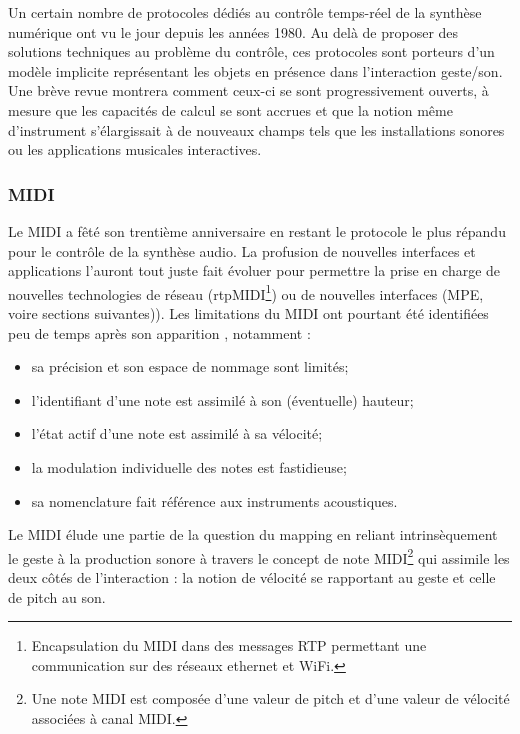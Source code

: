 Un certain nombre de protocoles dédiés au contrôle temps-réel de la synthèse numérique ont vu le jour depuis les années 1980. Au delà de proposer des solutions techniques au problème du contrôle, ces protocoles sont porteurs d’un modèle implicite représentant les objets en présence dans l’interaction geste/son. Une brève revue montrera comment ceux-ci se sont progressivement ouverts, à mesure que les capacités de calcul se sont accrues et que la notion même d’instrument s’élargissait à de nouveaux champs tels que les installations sonores ou les applications musicales interactives.

\subsubsection{MIDI}
Le \gls{MIDI} a fêté son trentième anniversaire en restant le protocole le plus répandu pour le contrôle de la synthèse audio. La profusion de nouvelles interfaces et applications l'auront tout juste fait évoluer pour permettre la prise en charge de nouvelles technologies de réseau (rtpMIDI\footnote{ Encapsulation du MIDI dans des messages RTP permettant une communication sur des réseaux ethernet et WiFi.}) ou de nouvelles interfaces (\gls{MPE}, voire sections suivantes)).
Les limitations du MIDI ont pourtant été identifiées peu de temps après son apparition \cite{mcmillen_zipi_1994}\cite{moore_dysfunctions_1988}\cite{selfridge-field_beyond_1997}, notamment :
\vspace{-1em}
\begin{itemize}[noitemsep]
	\item sa précision et son espace de nommage sont limités;
	\item l'identifiant d'une note est assimilé à son (éventuelle) hauteur;
	\item l'état actif d'une note est assimilé à sa vélocité;
	\item la modulation individuelle des notes est fastidieuse;
	\item sa nomenclature fait référence aux instruments acoustiques.
\end{itemize}

Le MIDI élude une partie de la question du mapping en reliant intrinsèquement le geste à la production sonore à travers le concept de note MIDI\footnote{ Une note MIDI est composée d'une valeur de pitch et d'une valeur de vélocité associées à canal MIDI.} qui assimile les deux côtés de l'interaction : la notion de vélocité se rapportant au geste et celle de pitch au son.

